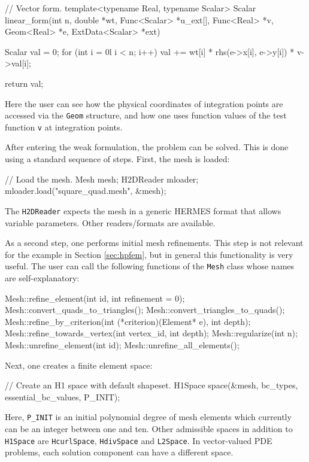 \documentclass[final,3p,times,twocolumn]{elsarticle}
\begin{document}
\begin{code}
// Vector form.
template<typename Real, typename Scalar>
Scalar linear_form(int n, double *wt, 
                   Func<Scalar> *u_ext[], 
                   Func<Real> *v, Geom<Real> *e, 
                   ExtData<Scalar> *ext)
{
  Scalar val = 0;
  for (int i = 0l i < n; i++) {
    val += wt[i] * rhs(e->x[i], e->y[i]) * v->val[i];
  }

  return val;
}
\end{code}
Here the user can see how the physical coordinates of 
integration points are accessed via the {\tt Geom}
structure, and how one uses function values of the 
test function {\tt v} at integration points.
 
After entering the weak formulation, the problem 
can be solved. This is done using a standard sequence 
of steps. First, the mesh is loaded:

\begin{code}
  // Load the mesh.
  Mesh mesh;
  H2DReader mloader;
  mloader.load("square_quad.mesh", &mesh);
\end{code}
The {\tt H2DReader} expects the mesh in a generic
HERMES format that allows variable parameters. 
Other readers/formats are available. 

As a second step, one performs initial mesh refinements. This
step is not relevant for the example in Section 
\ref{sec:hpfem}, but in general this functionality 
is very useful. The user can call the following 
functions of the {\tt Mesh} class whose names are 
self-explanatory:

\begin{code}
Mesh::refine_element(int id, int refinement = 0);
Mesh::convert_quads_to_triangles();
Mesh::convert_triangles_to_quads();
Mesh::refine_by_criterion(int (*criterion)(Element* e), 
                          int depth);
Mesh::refine_towards_vertex(int vertex_id, int depth);
Mesh::regularize(int n);
Mesh::unrefine_element(int id);
Mesh::unrefine_all_elements();
\end{code}
Next, one creates a finite element space:
\begin{code}
  // Create an H1 space with default shapeset.
  H1Space space(&mesh, bc_types, essential_bc_values, 
                P_INIT);
\end{code}
Here, {\tt P\_INIT} is an initial polynomial degree 
of mesh elements which currently can be an integer
between one and ten. Other admissible spaces in
addition to {\tt H1Space} are {\tt HcurlSpace},
{\tt HdivSpace} and {\tt L2Space}. In vector-valued
PDE problems, each solution component can have 
a different space.
\end{document}
